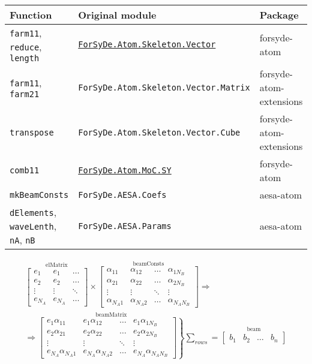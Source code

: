 \documentclass[
  a4paper,
]{article}
\begin{document}
\begin{longtable}[]{@{}lll@{}}
\toprule
Function & Original module & Package\tabularnewline
\midrule
\endhead
\texttt{farm11}, \texttt{reduce}, \texttt{length} &
\href{https://forsyde.github.io/forsyde-atom/api/ForSyDe-Atom-Skeleton-Vector.html}{\texttt{ForSyDe.Atom.Skeleton.Vector}}
& forsyde-atom\tabularnewline
\texttt{farm11}, \texttt{farm21} &
\texttt{ForSyDe.Atom.Skeleton.Vector.Matrix} &
forsyde-atom-extensions\tabularnewline
\texttt{transpose} & \texttt{ForSyDe.Atom.Skeleton.Vector.Cube} &
forsyde-atom-extensions\tabularnewline
\texttt{comb11} &
\href{https://forsyde.github.io/forsyde-atom/api/ForSyDe-Atom-MoC-SY.html}{\texttt{ForSyDe.Atom.MoC.SY}}
& forsyde-atom\tabularnewline
\texttt{mkBeamConsts} & \texttt{ForSyDe.AESA.Coefs} &
aesa-atom\tabularnewline
\texttt{dElements}, \texttt{waveLenth}, \texttt{nA}, \texttt{nB} &
\texttt{ForSyDe.AESA.Params} & aesa-atom\tabularnewline
\bottomrule
\end{longtable}

\begin{equation} \begin{gathered}
   \stackrel{\mbox{elMatrix}}{
   \begin{bmatrix}
    e_{1} & e_{1} & \dots  \\
    e_{2} & e_{2} & \dots  \\
    \vdots& \vdots& \ddots \\
    e_{N_A} & e_{N_A} & \dots
   \end{bmatrix}}
   \times
   \stackrel{\mbox{beamConsts}}{
   \begin{bmatrix}
    \alpha_{11} & \alpha_{12} & \dots  & \alpha_{1N_B} \\
    \alpha_{21} & \alpha_{22} & \dots  & \alpha_{2N_B} \\
    \vdots      & \vdots      & \ddots & \vdots\\
    \alpha_{N_A1} & \alpha_{N_A2} & \dots  & \alpha_{N_AN_B} 
   \end{bmatrix}}
   \Rightarrow\\\Rightarrow
   \stackrel{\mbox{beamMatrix}}{
   \left.\begin{bmatrix}
    e_1\alpha_{11} & e_1\alpha_{12} & \dots  & e_1\alpha_{1N_B} \\
    e_2\alpha_{21} & e_2\alpha_{22} & \dots  & e_2\alpha_{2N_B} \\
    \vdots & \vdots & \ddots & \vdots\\
    e_{N_A}\alpha_{N_A1} & e_{N_A}\alpha_{N_A2} & \dots  & e_{N_A}\alpha_{N_AN_B} 
   \end{bmatrix}\right\}}
   \sum_\mathit{rows}=
   \stackrel{\mbox{beam}}{
   \begin{bmatrix}
    b_1 & b_2 & \dots  & b_n 
   \end{bmatrix}}
   \end{gathered}
\label{eq:dbf-mat}\end{equation}
\end{document}
